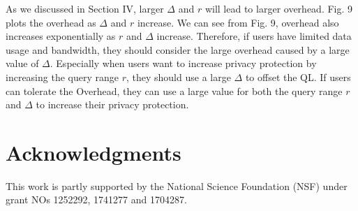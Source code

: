 \documentclass[a4paper,fleqn]{cas-dc}
\begin{document}
As we discussed in Section IV, larger $\Delta$ and $r$ will lead to larger overhead. Fig. 9 plots the overhead as $\Delta$ and $r$ increase. We can see from Fig. 9, overhead also increases exponentially as $r$ and $\Delta$ increase. Therefore, if users have limited data usage and bandwidth, they should consider the large overhead caused by a large value of $\Delta$. Especially when users want to increase privacy protection by increasing the query range $r$, they should use a large $\Delta$ to offset the QL. If users can tolerate the Overhead, they can use a large value for both the query range $r$ and $\Delta$ to increase their privacy protection.

\section *{Acknowledgments}
This work is partly supported by the National Science Foundation (NSF) under grant NOs 1252292, 1741277 and 1704287. 

\nocite{bugliesi2006automata,zhang2016fakemask,gedik2007protecting,vu2012efficient,he2016cost,soria2014enhancing,he2017latent,jorgensen2015conservative,liang2017location,junglas2008location,zheng2017follow,danezis2012financial,lamarca2007pervasive,feng2016relationship,yin2017location, zhang2010location,zheng2019privacy,niu2014achieving,chen2013privacy,ma2010privacy,trujillo2013privacy,yuan2011protecting,chatzikokolakis2013broadening,li2014data,dewri2012local,andres2013geo,fawaz2014location,li2013search,ardagna2007location,ardagna2008privacy,ardagna2009obfuscation,fang1986trilateration,fewell2006area}

%



\end{document}
